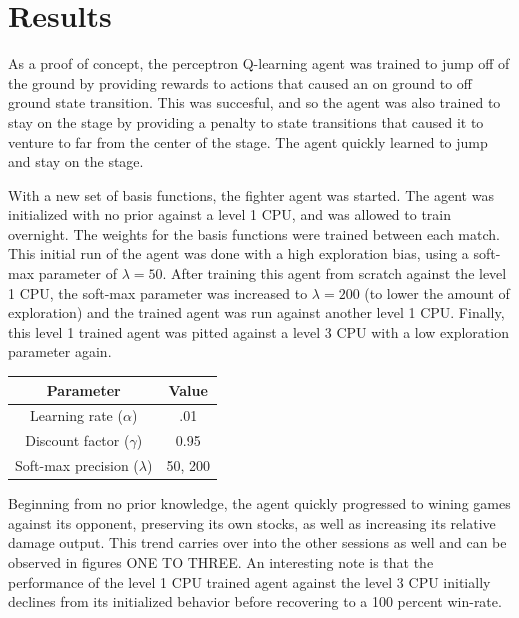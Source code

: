 \section{Results}

As a proof of concept, the perceptron Q-learning agent was trained to jump off of the ground by providing rewards to actions that caused an on ground to off ground state transition. This was succesful, and so the agent was also trained to stay on the stage by providing a penalty to state transitions that caused it to venture to far from the center of the stage. The agent quickly learned to jump and stay on the stage.

With a new set of basis functions, the fighter agent was started. The agent was initialized with no prior against a level 1 CPU, and was allowed to train overnight. The weights for the basis functions were trained between each match. This initial run of the agent was done with a high exploration bias, using a soft-max parameter of $\lambda = 50$. After training this agent from scratch against the level 1 CPU, the soft-max parameter was increased to $\lambda = 200$ (to lower the amount of exploration) and the trained agent was run against another level 1 CPU. Finally, this level 1 trained agent was pitted against a level 3 CPU with a low exploration parameter again.

\begin{center}
\begin{tabular}{| c | c | }
\hline
 Parameter & Value \\ 
 \hline\hline
 Learning rate ($\alpha$) & .01  \\  
 \hline
 Discount factor ($\gamma$) & 0.95 \\  
 \hline
 Soft-max precision ($\lambda$) & 50, 200 \\    
 \hline
\end{tabular}
\end{center}


Beginning from no prior knowledge, the agent quickly progressed to wining games against its opponent, preserving its own stocks, as well as increasing its relative damage output. This trend carries over into the other sessions as well and can be observed in figures ONE TO THREE. An interesting note is that the performance of the level 1 CPU trained agent against the level 3 CPU initially declines from its initialized behavior before recovering to a 100 percent win-rate. 

